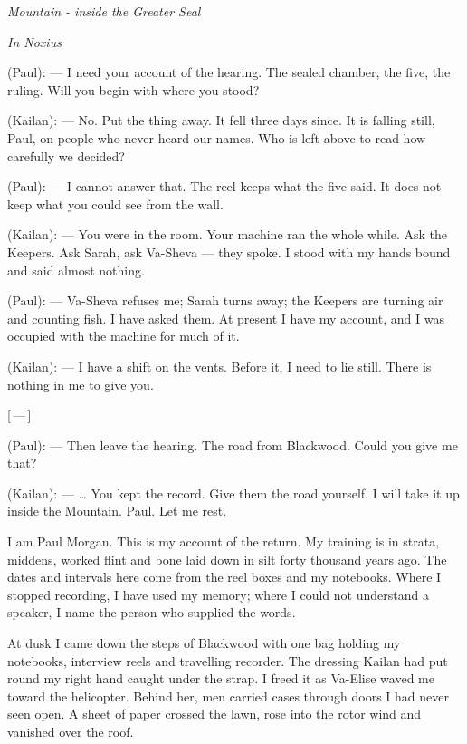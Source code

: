 
\begin{center}\small\itshape Mountain - inside the Greater Seal\end{center}

\begin{room}

\textit{In Noxius}

(Paul): --- I need your account of the hearing. The sealed chamber, the five, the ruling. Will you begin with where you stood?

(Kailan): --- No. Put the thing away. It fell three days since. It is falling still, Paul, on people who never heard our names. Who is left above to read how carefully we decided?

(Paul): --- I cannot answer that. The reel keeps what the five said. It does not keep what you could see from the wall.

(Kailan): --- You were in the room. Your machine ran the whole while. Ask the Keepers. Ask Sarah, ask Va-Sheva --- they spoke. I stood with my hands bound and said almost nothing.

(Paul): --- Va-Sheva refuses me; Sarah turns away; the Keepers are turning air and counting fish. I have asked them. At present I have my account, and I was occupied with the machine for much of it.

(Kailan): --- I have a shift on the vents. Before it, I need to lie still. There is nothing in me to give you.

\centerline{[\,---\,]}

(Paul): --- Then leave the hearing. The road from Blackwood. Could you give me that?

(Kailan): --- \ldots{} You kept the record. Give them the road yourself. I will take it up inside the Mountain. Paul. Let me rest.

\end{room}

I am Paul Morgan. This is my account of the return. My training is in strata, middens, worked flint and bone laid down in silt forty thousand years ago. The dates and intervals here come from the reel boxes and my notebooks. Where I stopped recording, I have used my memory; where I could not understand a speaker, I name the person who supplied the words.\par

At dusk I came down the steps of Blackwood with one bag holding my notebooks, interview reels and travelling recorder. The dressing Kailan had put round my right hand caught under the strap. I freed it as Va-Elise waved me toward the helicopter. Behind her, men carried cases through doors I had never seen open. A sheet of paper crossed the lawn, rose into the rotor wind and vanished over the roof.\par

